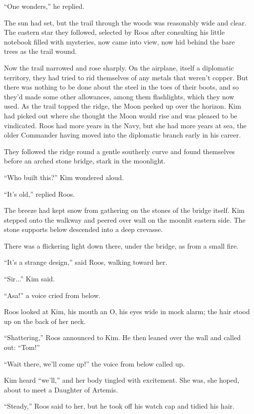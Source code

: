 \documentclass[11pt,a5paper]{article}
\begin{document}
``One wonders,'' he replied.

The sun had set, but the trail through the woods was reasonably wide and clear. The eastern star they followed, selected by Roos after consulting his little notebook filled with mysteries, now came into view, now hid behind the bare trees as the trail wound.

Now the trail narrowed and rose sharply. On the airplane, itself a diplomatic territory, they had tried to rid themselves of any metals that weren't copper. But there was nothing to be done about the steel in the toes of their boots, and so they'd made some other allowances, among them flashlights, which they now used. As the trail topped the ridge, the Moon peeked up over the horizon. Kim had picked out where she thought the Moon would rise and was pleased to be vindicated. Roos had more years in the Navy, but she had more years at sea, the older Commander having moved into the diplomatic branch early in his career.

They followed the ridge round a gentle southerly curve and found themselves before an arched stone bridge, stark in the moonlight.

``Who built this?'' Kim wondered aloud.

``It's old,'' replied Roos.

The breeze had kept snow from gathering on the stones of the bridge itself. Kim stepped onto the walkway and peered over wall on the moonlit eastern side. The stone supports below descended into a deep crevasse.

There was a flickering light down there, under the bridge, as from a small fire.

``It's a strange design,'' said Roos, walking toward her.

``Sir...'' Kim said.

``Asa!'' a voice cried from below.

Roos looked at Kim, his mouth an O, his eyes wide in mock alarm; the hair stood up on the back of her neck.

``Shattering,'' Roos announced to Kim. He then leaned over the wall and called out: ``Tom!''

``Wait there, we'll come up!'' the voice from below called up.

Kim heard ``we'll,'' and her body tingled with excitement. She was, she hoped, about to meet a Daughter of Artemis.

``Steady,'' Roos said to her, but he took off his watch cap and tidied his hair.
\end{document}
